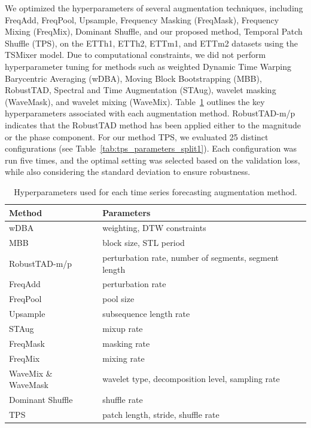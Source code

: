 We optimized the hyperparameters of several augmentation techniques, including FreqAdd, FreqPool, Upsample, Frequency Masking (FreqMask), Frequency Mixing (FreqMix), Dominant Shuffle, and our proposed method, Temporal Patch Shuffle (TPS), on the ETTh1, ETTh2, ETTm1, and ETTm2 datasets using the TSMixer model. Due to computational constraints, we did not perform hyperparameter tuning for methods such as weighted Dynamic Time Warping Barycentric Averaging (wDBA), Moving Block Bootstrapping (MBB), RobustTAD,  Spectral and Time Augmentation (STAug), wavelet masking (WaveMask), and wavelet mixing (WaveMix).
Table~\ref{tab:aug_params} outlines the key hyperparameters associated with each augmentation method. RobustTAD-m/p indicates that the RobustTAD method has been applied either to the magnitude or the phase component. For our method TPS, we evaluated 25 distinct configurations (see Table~\ref{tab:tps_parameters_split1}). Each configuration was run five times, and the optimal setting was selected based on the validation loss, while also considering the standard deviation to ensure robustness.

\begin{table}[h!]
\centering
\begin{tabular}{@{}ll@{}}
\toprule
\textbf{Method} & \textbf{Parameters} \\
\midrule
wDBA              & weighting, DTW constraints \\
MBB               & block size, STL period \\
RobustTAD-m/p     & perturbation rate, number of segments, segment length \\
FreqAdd           & perturbation rate \\
FreqPool          & pool size \\
Upsample          & subsequence length rate \\
STAug             & mixup rate \\
FreqMask          & masking rate \\
FreqMix           & mixing rate \\
WaveMix \& WaveMask      & wavelet type, decomposition level, sampling rate \\
Dominant Shuffle  & shuffle rate \\
TPS               & patch length, stride, shuffle rate \\
\bottomrule
\end{tabular}
\caption{Hyperparameters used for each time series forecasting augmentation method.}

\label{tab:aug_params}
\end{table}



